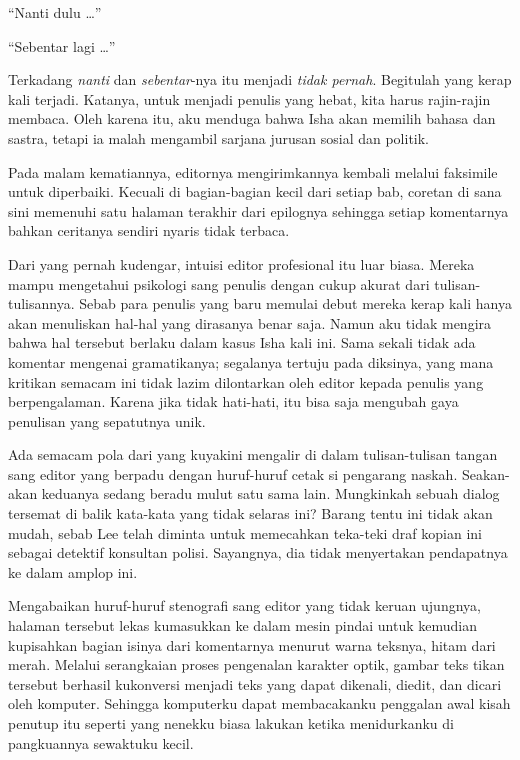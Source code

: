 \documentclass[smalldemyvopaper,11pt,twoside,onecolumn,openright,extrafontsizes]{memoir}
\begin{document}
``Nanti dulu \dots''

``Sebentar lagi \dots''

Terkadang \textit{nanti} dan \textit{sebentar}-nya itu menjadi \textit{tidak pernah}. Begitulah yang kerap kali terjadi. Katanya, untuk menjadi penulis yang hebat, kita harus rajin-rajin membaca. Oleh karena itu, aku menduga bahwa Isha akan memilih bahasa dan sastra, tetapi ia malah mengambil sarjana jurusan sosial dan politik.

Pada malam kematiannya, editornya mengirimkannya kembali melalui faksimile untuk diperbaiki. Kecuali di bagian-bagian kecil dari setiap bab, coretan di sana sini memenuhi satu halaman terakhir dari epilognya sehingga setiap komentarnya bahkan ceritanya sendiri nyaris tidak terbaca. %

Dari yang pernah kudengar, intuisi editor profesional itu luar biasa. Mereka mampu mengetahui psikologi sang penulis dengan cukup akurat dari tulisan-tulisannya. Sebab para penulis yang baru memulai debut mereka kerap kali hanya akan menuliskan hal-hal yang dirasanya benar saja. Namun aku tidak mengira bahwa hal tersebut berlaku dalam kasus Isha kali ini. Sama sekali tidak ada komentar mengenai gramatikanya; segalanya tertuju pada diksinya, yang mana kritikan semacam ini tidak lazim dilontarkan oleh editor kepada penulis yang berpengalaman. Karena jika tidak hati-hati, itu bisa saja mengubah gaya penulisan yang sepatutnya unik.


Ada semacam pola dari yang kuyakini mengalir di dalam tulisan-tulisan tangan sang editor yang berpadu dengan huruf-huruf cetak si pengarang naskah. Seakan-akan keduanya sedang beradu mulut satu sama lain. Mungkinkah sebuah dialog tersemat di balik kata-kata yang tidak selaras ini? Barang tentu ini tidak akan mudah, sebab Lee telah diminta untuk memecahkan teka-teki draf kopian ini sebagai detektif konsultan polisi. Sayangnya, dia tidak menyertakan pendapatnya ke dalam amplop ini.


Mengabaikan huruf-huruf stenografi sang editor yang tidak keruan ujungnya, halaman tersebut lekas kumasukkan ke dalam mesin pindai untuk kemudian kupisahkan bagian isinya dari komentarnya menurut warna teksnya, hitam dari merah. Melalui serangkaian proses pengenalan karakter optik, gambar teks tikan tersebut berhasil kukonversi menjadi teks yang dapat dikenali, diedit, dan dicari oleh komputer. Sehingga komputerku dapat membacakanku penggalan awal kisah penutup itu seperti yang nenekku biasa lakukan ketika menidurkanku di pangkuannya sewaktuku kecil.
\end{document}
